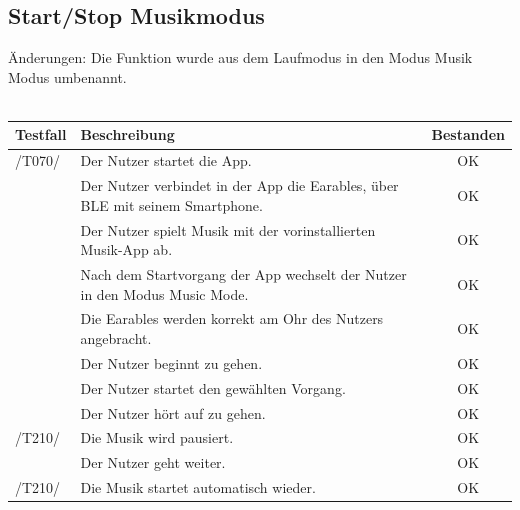 \documentclass[a4paper,12pt]{article}
\newcommand{\testok}[0]{
	\cellcolor{green!25} OK
}
\begin{document}
\subsection{Start/Stop Musikmodus}
Änderungen: Die Funktion wurde aus dem Laufmodus in den Modus \glqq Musik Modus\grqq{} umbenannt.
\\
\\
\begin{tabular}{ |p{1.5cm} | p{12cm} | c| }
	\hline
	\textbf{Testfall} & \textbf{Beschreibung} & \textbf{Bestanden}\\
	\hline
	/T070/ & Der Nutzer startet die App. & \testok \\
	\hline
	& Der Nutzer verbindet in der App die Earables, über BLE mit seinem Smartphone. & \testok \\
	\hline
	& Der Nutzer spielt Musik mit der vorinstallierten Musik-App ab. & \testok \\
	\hline
	& Nach dem Startvorgang der App wechselt der Nutzer in den Modus \glqq Music Mode\grqq . & \testok \\
	\hline
	& Die Earables werden korrekt am Ohr des Nutzers angebracht. & \testok \\
	\hline
	& Der Nutzer beginnt zu gehen. & \testok  \\
	\hline
	& Der Nutzer startet den gewählten Vorgang. & \testok  \\
	\hline
	& Der Nutzer hört auf zu gehen. & \testok  \\
	\hline
	/T210/ & Die Musik wird pausiert. & \testok  \\
	\hline
	& Der Nutzer geht weiter. & \testok  \\
	\hline
	/T210/ & Die Musik startet automatisch wieder. & \testok  \\
	\hline
\end{tabular}
\end{document}

